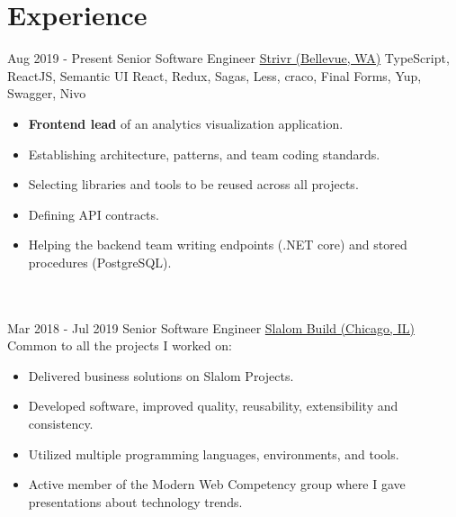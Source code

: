 \documentclass[letterpaper]{template} %
\begin{document}
\makeprofile %


\section{Experience}

\begin{twenty} %
    \twentyitem
    	{Aug 2019 - Present}
		{}
        {Senior Software Engineer}
        {\href{https://www.strivr.com//}{Strivr (Bellevue, WA)}}
        {TypeScript, ReactJS, Semantic UI React, Redux, Sagas, Less, craco, Final Forms, Yup, Swagger, Nivo}
        {\begin{itemize}
            \item \textbf{Frontend lead} of an analytics visualization application.
            \item Establishing architecture, patterns, and team coding standards.
            \item Selecting libraries and tools to be reused across all projects.
            \item Defining API contracts.
            \item Helping the backend team writing endpoints (.NET core) and stored procedures (PostgreSQL).
        \end{itemize}}
    \\\divider\\
    \twentyitem
    	{Mar 2018 - Jul 2019}
		{}
        {Senior Software Engineer}
        {\href{https://www.slalom.com/}{Slalom Build (Chicago, IL)}}
        {Common to all the projects I worked on:}
        {\begin{itemize}
            \item Delivered business solutions on Slalom Projects.
            \item Developed software, improved quality, reusability, extensibility and consistency.
            \item Utilized multiple programming languages, environments, and tools.
            \item Active member of the Modern Web Competency group where I gave presentations about technology trends.
        \end{itemize}}
    \twentyitem
        {}
        {}

\end{twenty}
\end{document}
